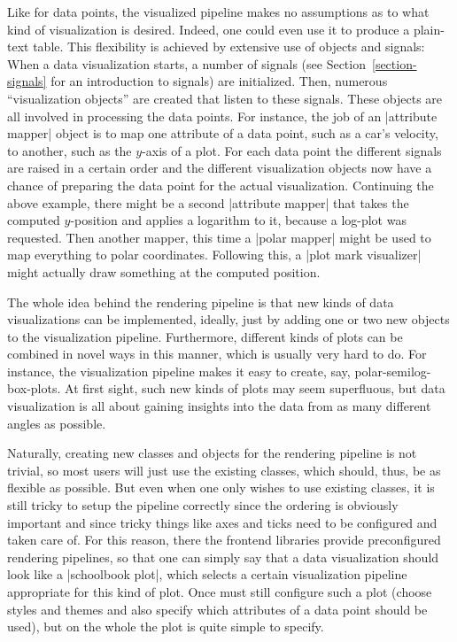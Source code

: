 Like for data points, the visualized pipeline makes no assumptions as
to what kind of visualization is desired. Indeed, one could even use
it to produce a plain-text table. This flexibility is achieved by
extensive use of objects and signals: When a data visualization
starts, a number of signals (see Section~\ref{section-signals} for an
introduction to signals) are initialized. Then, numerous
``visualization objects'' are created that listen to these
signals. These objects are all involved in processing the data
points. For instance, the job of an |attribute mapper| object is to
map one attribute of a data point, such as a car's velocity, to
another, such as the $y$-axis of a plot. For each data point the
different signals are raised in a certain order and the different
visualization objects now have a chance of preparing the data point
for the actual visualization. Continuing the above example, there
might be a second |attribute mapper| that takes the computed
$y$-position and applies a logarithm to it, because a log-plot was
requested. Then another mapper, this time a |polar mapper| might be
used to map everything to polar coordinates. Following this, a
|plot mark visualizer| might actually draw something at the computed
position.

The whole idea behind the rendering pipeline is that new kinds of data
visualizations can be implemented, ideally, just by adding one or two
new objects to the visualization pipeline. Furthermore, different
kinds of plots can be combined in novel ways in this manner, which is
usually very hard to do. For instance, the visualization pipeline
makes it easy to create, say, polar-semilog-box-plots. At first sight,
such new kinds of plots may seem superfluous, but data visualization
is all about gaining insights into the data from as many different
angles as possible.

Naturally, creating new classes and objects for the rendering pipeline
is not trivial, so most users will just use the existing classes,
which should, thus, be as flexible as possible. But even when one only
wishes to use existing classes, it is still tricky to setup the
pipeline correctly since the ordering is obviously important and since
tricky things like axes and ticks need to be configured and taken care
of. For this reason, there the frontend libraries provide
preconfigured rendering pipelines, so that one can simply say that a
data visualization should look like a |schoolbook plot|, which selects
a certain visualization pipeline appropriate for this kind of
plot. Once must still configure such a plot (choose styles and themes
and also specify which attributes of a data point should be used), but
on the whole the plot is quite simple to specify.





